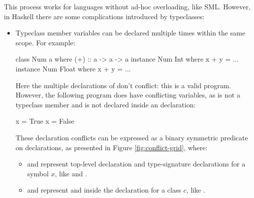 \documentclass[dissertation.tex]{subfiles}
\begin{document}
{{        This process works for languages without ad-hoc overloading, like SML. However, in Haskell there are some
        complications introduced by typeclasses:

        \begin{itemize}
        \item
        {
            
            Typeclass member variables can be declared multiple times within the same scope. For example:
            
            \begin{haskellfigure}
            class Num a where
                (+) :: a -> a -> a
            instance Num Int where
                x + y = ...
            instance Num Float where
                x + y = ...
            \end{haskellfigure}

            Here the multiple declarations of \haskell{(+)} don't conflict: this is a valid program. However, the
            following program does have conflicting variables, as  is not a typeclass member and is not
            declared inside an  declaration:

            \begin{haskellfigure}
            x = True
            x = False
            \end{haskellfigure}

            These declaration conflicts can be expressed as a binary symmetric predicate on declarations, as presented
            in Figure \ref{fig:conflict-grid}, where:

            \begin{itemize}
            \item
            {

                 and  represent top-level declaration and type-signature
                declarations for a symbol \(x\), like  and .

            }
            \item
            {
                
                 and  represent  and  inside the declaration for a class \(c\), like .

}
\end{itemize}}
\end{itemize}}}
\end{document}
